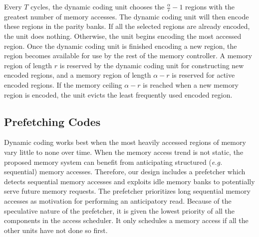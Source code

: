 Every $T$ cycles, the dynamic coding unit chooses the $\frac{\alpha}{r} - 1$ regions with the greatest number of memory accesses. The dynamic coding unit will then encode these regions in the parity banks. If all the selected regions are already encoded, the unit does nothing. Otherwise, the unit begins encoding the most accessed region. Once the dynamic coding unit is finished encoding a new region, the region becomes available for use by the rest of the memory controller. A memory region of length $r$ is reserved by the dynamic coding unit for constructing new encoded regions, and a memory region of length $\alpha - r$ is reserved for active encoded regions. If the memory ceiling $\alpha - r$ is reached when a new memory region is encoded, the unit evicts the least frequently used encoded region.

\subsection{Prefetching Codes}
\label{sec:prefetching}
Dynamic coding works best when the most heavily accessed regions of memory vary little to none over time. When the memory access trend is not static, the proposed memory system can benefit from anticipating structured (\textit{e.g.} sequential) memory accesses. Therefore, our design includes a prefetcher which detects sequential memory accesses and exploits idle memory banks to potentially serve future memory requests. The prefetcher prioritizes long sequential memory accesses as motivation for performing an anticipatory read. Because of the speculative nature of the prefetcher, it is given the lowest priority of all the components in the access scheduler. It only schedules a memory access if all the other units have not done so first. 
